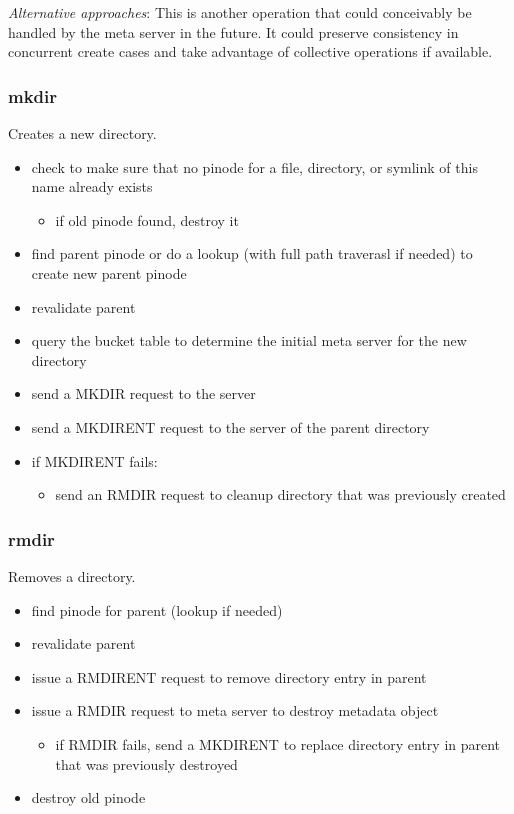 \documentclass[11pt, letterpaper]{article}
\begin{document}
\emph{Alternative approaches}: This is another operation that could
conceivably be handled by the meta server in the future.  It could 
preserve consistency in concurrent create cases and take advantage of
collective operations if available.

\subsubsection{mkdir}

Creates a new directory.

\begin{itemize}
\item check to make sure that no pinode for a file, directory, or
symlink of this name already exists
\begin{itemize}
\item if old pinode found, destroy it
\end{itemize}
\item find parent pinode or do a lookup (with full path traverasl if needed) 
to create new parent pinode
\item revalidate parent
\item query the bucket table to determine the initial meta server for
the new directory
\item send a MKDIR request to the server
\item send a MKDIRENT request to the server of the parent directory
\item if MKDIRENT fails:
\begin{itemize}
\item send an RMDIR request to cleanup directory that was previously
created
\end{itemize}
\end{itemize}

\subsubsection{rmdir}

Removes a directory.

\begin{itemize}
\item find pinode for parent (lookup if needed)
\item revalidate parent
\item issue a RMDIRENT request to remove directory entry in parent
\item issue a RMDIR request to meta server to destroy metadata object
\begin{itemize}
\item if RMDIR fails, send a MKDIRENT to replace directory entry in
parent that was previously destroyed
\end{itemize}
\item destroy old pinode
\end{itemize}
\end{document}
